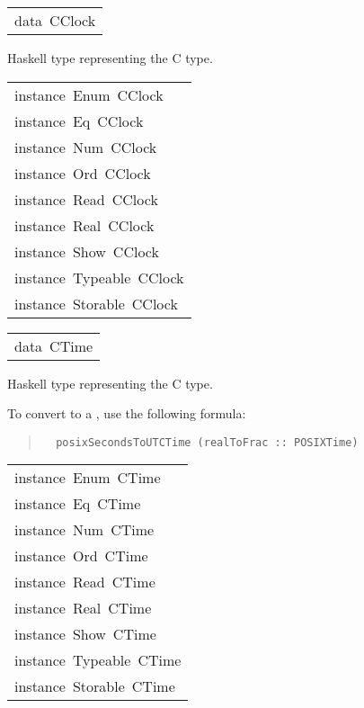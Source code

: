 \begin{haddockdesc}
\item[\begin{tabular}{@{}l}
data\ CClock
\end{tabular}]\haddockbegindoc
Haskell type representing the C  type.
\par

\end{haddockdesc}
\begin{haddockdesc}
\item[\begin{tabular}{@{}l}
instance\ Enum\ CClock\\instance\ Eq\ CClock\\instance\ Num\ CClock\\instance\ Ord\ CClock\\instance\ Read\ CClock\\instance\ Real\ CClock\\instance\ Show\ CClock\\instance\ Typeable\ CClock\\instance\ Storable\ CClock
\end{tabular}]
\end{haddockdesc}
\begin{haddockdesc}
\item[\begin{tabular}{@{}l}
data\ CTime
\end{tabular}]\haddockbegindoc
Haskell type representing the C  type.
\par
To convert to a , use the following formula:
\par
\begin{quote}
{\haddockverb\begin{verbatim}
  posixSecondsToUTCTime (realToFrac :: POSIXTime)
\end{verbatim}}
\end{quote}

\end{haddockdesc}
\begin{haddockdesc}
\item[\begin{tabular}{@{}l}
instance\ Enum\ CTime\\instance\ Eq\ CTime\\instance\ Num\ CTime\\instance\ Ord\ CTime\\instance\ Read\ CTime\\instance\ Real\ CTime\\instance\ Show\ CTime\\instance\ Typeable\ CTime\\instance\ Storable\ CTime
\end{tabular}]
\end{haddockdesc}
